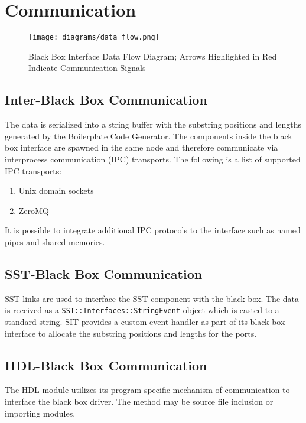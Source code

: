 \documentclass{article}
\begin{document}
  \section{Communication}

  \begin{figure}[!h]
    \centering
    \texttt{[image: diagrams/data\_flow.png]}
    \caption{Black Box Interface Data Flow Diagram; Arrows Highlighted in Red Indicate
    Communication Signals}
    \label{fig:data_flow}
  \end{figure}

    \subsection{Inter-Black Box Communication} \label{sec:ipc}
    The data is serialized into a string buffer with the substring positions and lengths generated
    by the Boilerplate Code Generator. The components inside the black box interface are spawned in
    the same node and therefore communicate via interprocess communication (IPC) transports. The
    following is a list of supported IPC transports:
    \begin{enumerate}
      \item Unix domain sockets
      \item ZeroMQ
    \end{enumerate}

    It is possible to integrate additional IPC protocols to the interface such as named pipes and
    shared memories.

    \subsection{SST-Black Box Communication}
    SST links are used to interface the SST component with the black box. The data is received as a
    \texttt{SST::Interfaces::StringEvent} object which is casted to a standard string. SIT
    provides a custom event handler as part of its black box interface to allocate the substring
    positions and lengths for the ports.

    \subsection{HDL-Black Box Communication}
    The HDL module utilizes its program specific mechanism of communication to interface the black
    box driver. The method may be source file inclusion or importing modules.
\end{document}
